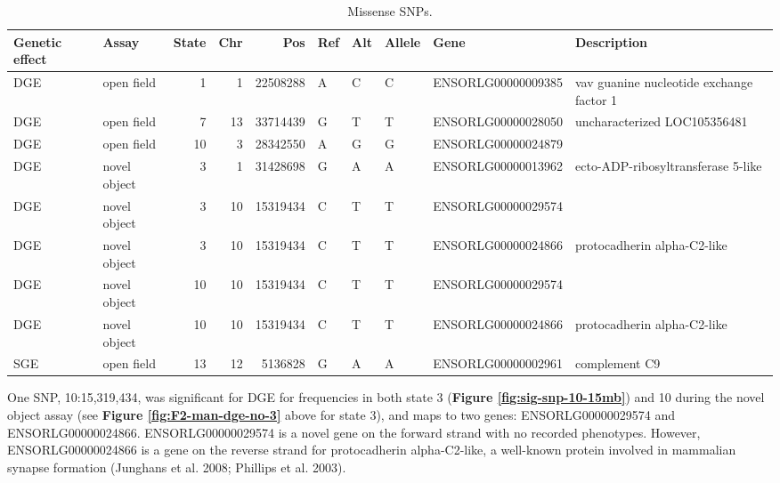 \documentclass[
]{book}
\begin{document}
\begin{table}

\caption{\label{tab:F2-sig-snps-missense}Missense SNPs.}
\centering
\begin{tabular}[t]{l|l|r|r|r|l|l|l|l|l}
\hline
Genetic effect & Assay & State & Chr & Pos & Ref & Alt & Allele & Gene & Description\\
\hline
DGE & open field & 1 & 1 & 22508288 & A & C & C & ENSORLG00000009385 & vav guanine nucleotide exchange factor 1\\
\hline
DGE & open field & 7 & 13 & 33714439 & G & T & T & ENSORLG00000028050 & uncharacterized LOC105356481\\
\hline
DGE & open field & 10 & 3 & 28342550 & A & G & G & ENSORLG00000024879 & \\
\hline
DGE & novel object & 3 & 1 & 31428698 & G & A & A & ENSORLG00000013962 & ecto-ADP-ribosyltransferase 5-like\\
\hline
DGE & novel object & 3 & 10 & 15319434 & C & T & T & ENSORLG00000029574 & \\
\hline
DGE & novel object & 3 & 10 & 15319434 & C & T & T & ENSORLG00000024866 & protocadherin alpha-C2-like\\
\hline
DGE & novel object & 10 & 10 & 15319434 & C & T & T & ENSORLG00000029574 & \\
\hline
DGE & novel object & 10 & 10 & 15319434 & C & T & T & ENSORLG00000024866 & protocadherin alpha-C2-like\\
\hline
SGE & open field & 13 & 12 & 5136828 & G & A & A & ENSORLG00000002961 & complement C9\\
\hline
\end{tabular}
\end{table}

One SNP, 10:15,319,434, was significant for DGE for frequencies in both state 3 (\textbf{Figure \ref{fig:sig-snp-10-15mb}}) and 10 during the novel object assay (see \textbf{Figure \ref{fig:F2-man-dge-no-3}} above for state 3), and maps to two genes: ENSORLG00000029574 and ENSORLG00000024866. ENSORLG00000029574 is a novel gene on the forward strand with no recorded phenotypes. However, ENSORLG00000024866 is a gene on the reverse strand for protocadherin alpha-C2-like, a well-known protein involved in mammalian synapse formation (Junghans et al. 2008; Phillips et al. 2003).
\end{document}
